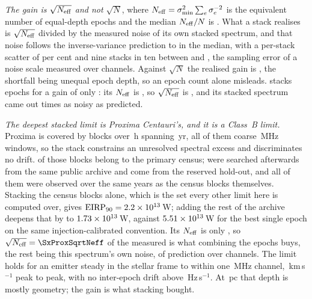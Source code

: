 \emph{The gain is $\sqrt{N_{\rm eff}}$ and not $\sqrt{N}$}, where
$N_{\rm eff}=\sigma_{\min}^{2}\sum_e\sigma_e^{-2}$ is the equivalent number of
equal-depth epochs and the median $N_{\rm eff}/N$ is \StkNeffFrac. What a
stack realises is $\sqrt{N_{\rm eff}}$ divided by the measured noise of its
own stacked spectrum, and that noise follows the inverse-variance prediction
to \StkGainVsNeff{} in the median, with a per-stack scatter of
\StkMadZScatterPct{} per cent and nine stacks in ten between \SzNoiseLo{} and
\SzNoiseHi, the sampling error of a noise scale measured over
\StkNChanMed{} channels. Against $\sqrt{N}$ the realised gain is \StkGainVsN, the
shortfall being unequal epoch depth, so an epoch count alone misleads.
\StkWorstStar{} stacks \StkWorstN{} epochs for a gain of only \StkWorstGain:
its $N_{\rm eff}$ is \StkWorstNeff, so $\sqrt{N_{\rm eff}}$ is
\SzWorstSqrtNeff, and its stacked spectrum came out \SzWorstNoise{} times as
noisy as predicted.

\emph{The deepest stacked limit is Proxima Centauri's, and it is a Class~B
limit.} Proxima is covered by \StkProxN{} blocks over \StkProxHours\,h
spanning \StkProxSpanYr\,yr, all of them coarse \ChanBModeMHz\,MHz windows,
so the stack constrains an unresolved spectral excess and discriminates no
drift. \SxProxEbCensus{} of those blocks belong to the primary census;
\SzProxEbSearched{} were searched afterwards from the same public archive and
\SzProxEbHold{} come from the reserved hold-out, and all of them were
observed over the same years as the census blocks themselves. Stacking the
census blocks alone, which is the set every other limit here is computed
over, gives $\mathrm{EIRP}_{90}=2.2\times10^{13}$\,W; adding the rest of the
archive deepens that by \SzProxDeepen{} to $1.73\times10^{13}$\,W, against
$5.51 \times 10^{13}$\,W for the best single epoch on the same
injection-calibrated convention. Its $N_{\rm eff}$ is only \StkProxNeff, so
$\sqrt{N_{\rm eff}}=\SxProxSqrtNeff$ of the measured \StkProxGain{} is what
combining the epochs buys, the rest being this spectrum's own noise,
\SyProxNoiseMeas{} of prediction over \SxProxNChan{} channels. The limit
holds for an emitter steady in the
stellar frame to within one \ChanBModeMHz\,MHz channel,
\StkProxTolKms\,km\,s$^{-1}$ peak to peak, with no inter-epoch drift above
\StkProxDriftHzS\,Hz\,s$^{-1}$. At \StkProxDistPc\,pc that depth is mostly
geometry; the gain is what stacking bought.

